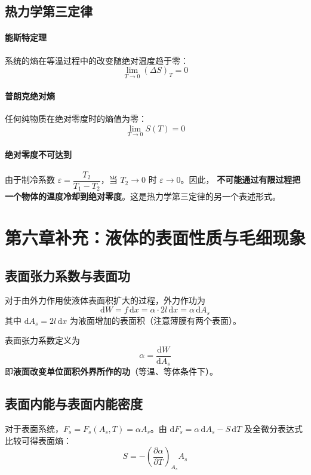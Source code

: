 \documentclass[UTF8]{ctexart}
\begin{document}
\subsection{热力学第三定律}

\paragraph{能斯特定理}
系统的熵在等温过程中的改变随绝对温度趋于零：
\[
\boxed{\lim_{T\to 0}(\Delta S)_T=0}
\]

\paragraph{普朗克绝对熵}
任何纯物质在绝对零度时的熵值为零：
\[
\boxed{\lim_{T\to 0}S(T)=0}
\]

\paragraph{绝对零度不可达到}
由于制冷系数 $\varepsilon=\dfrac{T_2}{T_1-T_2}$，当 $T_2\to 0$ 时 $\varepsilon\to 0$。因此，
\textbf{不可能通过有限过程把一个物体的温度冷却到绝对零度}。这是热力学第三定律的另一个表述形式。


\section{第六章补充：液体的表面性质与毛细现象}

\subsection{表面张力系数与表面功}

对于由外力作用使液体表面积扩大的过程，外力作功为
\[
\mathrm{d}W=f\,\mathrm{d}x=\alpha\cdot 2l\,\mathrm{d}x=\alpha\,\mathrm{d}A_s
\]
其中 $\mathrm{d}A_s=2l\,\mathrm{d}x$ 为液面增加的表面积（注意薄膜有两个表面）。

表面张力系数定义为
\[
\boxed{\alpha=\frac{\mathrm{d}W}{\mathrm{d}A_s}}
\]
即\textbf{液面改变单位面积外界所作的功}（等温、等体条件下）。

\subsection{表面内能与表面内能密度}

对于表面系统，$F_s=F_s(A_s,T)=\alpha A_s$。由 $\mathrm{d}F_s=\alpha\,\mathrm{d}A_s-S\,\mathrm{d}T$ 及全微分表达式比较可得表面熵：
\[
S=-\left(\frac{\partial\alpha}{\partial T}\right)_{A_s}A_s
\]
\end{document}
